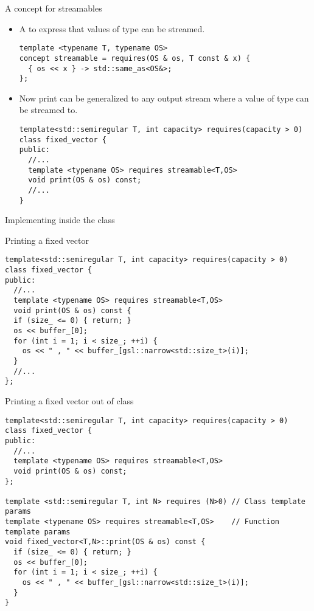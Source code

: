 \begin{frame}[t,fragile]{A concept for streamables}
\begin{itemize}
  \item A  to express that values of type  can be streamed.
\begin{lstlisting}
template <typename T, typename OS>
concept streamable = requires(OS & os, T const & x) {
  { os << x } -> std::same_as<OS&>;
};
\end{lstlisting}

  \item Now print can be generalized to any output stream where a value of type  can be 
        streamed to.
\begin{lstlisting}
template<std::semiregular T, int capacity> requires(capacity > 0)
class fixed_vector {
public:
  //...
  template <typename OS> requires streamable<T,OS>
  void print(OS & os) const;
  //...
}
\end{lstlisting}
\end{itemize}
\end{frame}

\begin{frame}[t,fragile]{Implementing inside the class}
\begin{block}{Printing a fixed vector}
\begin{lstlisting}
template<std::semiregular T, int capacity> requires(capacity > 0)
class fixed_vector {
public:
  //...
  template <typename OS> requires streamable<T,OS>
  void print(OS & os) const {
  if (size_ <= 0) { return; }
  os << buffer_[0];
  for (int i = 1; i < size_; ++i) {
    os << " , " << buffer_[gsl::narrow<std::size_t>(i)];
  }
  //...
};
\end{lstlisting}
\end{block}
\end{frame}

\begin{frame}[t,fragile]
\begin{block}{Printing a fixed vector out of class}
\begin{lstlisting}
template<std::semiregular T, int capacity> requires(capacity > 0)
class fixed_vector {
public:
  //...
  template <typename OS> requires streamable<T,OS>
  void print(OS & os) const;
};

template <std::semiregular T, int N> requires (N>0) // Class template params
template <typename OS> requires streamable<T,OS>    // Function template params
void fixed_vector<T,N>::print(OS & os) const {
  if (size_ <= 0) { return; }
  os << buffer_[0];
  for (int i = 1; i < size_; ++i) {
    os << " , " << buffer_[gsl::narrow<std::size_t>(i)];
  }
}
\end{lstlisting}

\end{block}
\end{frame}
